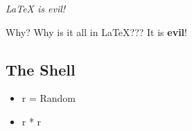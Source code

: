 \textit{LaTeX is evil!} 

Why? Why is it all in LaTeX??? It is \textbf{evil}!


\subsection{The Shell}
\begin{itemize}
\item r = Random
\item r * r
\end{itemize}
